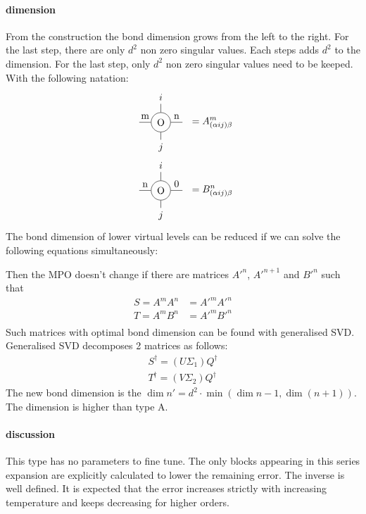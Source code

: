 \paragraph{dimension} From the construction the bond dimension grows from the left to the right. For the last step, there are only $d^2$ non zero singular values.  Each steps adds $d^2$ to the dimension.
For the last step, only $d^2$ non zero singular values need to be keeped. With the following natation:
\begin{equation}
    \begin{split}
        \mpo{1}{ {"m","n"}  }{ { "\(i\)",}}{ { "$j$",}}{}{} &= A^m_{ (\alpha i j ) \beta} \\
        \mpo{1}{ {"n","0"}  }{ { "$i$",}}{ { "$j$",}}{}{} &= B^n_{ (\alpha i j ) \beta} \\
    \end{split}
\end{equation}
The bond dimension of lower virtual levels can be reduced if we can solve the following equations simultaneously:

Then the MPO doesn't change if there are matrices $A'^{n}$, $A'^{n+1}$ and $B'^{n}$ such that
\begin{equation}
    \begin{split}
        S=A^{m} A^{n} &= A'^{m} A'^{n} \\
        T=A^{m} B^{n} &= A'^{m} B'^{n} \\
    \end{split}
\end{equation}
Such matrices with optimal bond dimension can be found with generalised SVD. Generalised SVD decomposes 2 matrices as follows:
\begin{equation}
    \begin{split}
        S^{\dagger} = (U \Sigma_1) Q^{\dagger} \\
        T^{\dagger} = (V \Sigma_2) Q^{\dagger}
    \end{split}
\end{equation}
The new bond dimension is the $\dim{n'} =d^2 \cdot \min( \dim{n-1}, \dim (n+1) )$.  The dimension is higher than type A.




\paragraph{discussion}

This type has no parameters to fine tune. The only blocks appearing in this series expansion are explicitly calculated to lower the remaining error. The inverse is well defined. It is expected that the error increases strictly with increasing temperature and keeps decreasing for higher orders.

